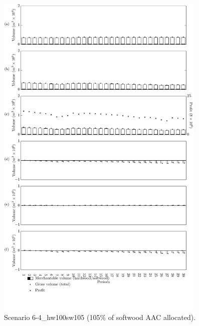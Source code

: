 \begin{figure}[h]
  \centering
  \includegraphics[width=10cm]{images/appendix/s6-4_hw100sw105}
  \caption{Scenario 6-4\_hw100sw105 (105\% of softwood AAC allocated).}
  \label{fig:s6-4_hw100sw105}
\end{figure}


